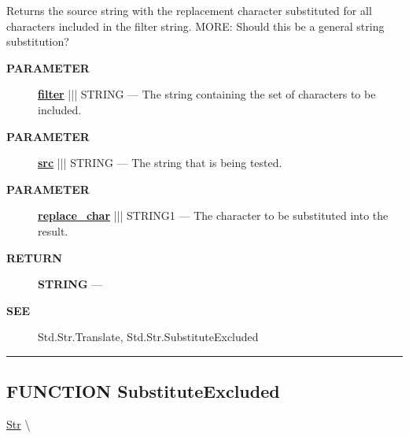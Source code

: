 \par





Returns the source string with the replacement character substituted for all characters included in the filter string. MORE: Should this be a general string substitution?






\par
\begin{description}
\item [\colorbox{tagtype}{\color{white} \textbf{\textsf{PARAMETER}}}] \textbf{\underline{filter}} ||| STRING --- The string containing the set of characters to be included.
\item [\colorbox{tagtype}{\color{white} \textbf{\textsf{PARAMETER}}}] \textbf{\underline{src}} ||| STRING --- The string that is being tested.
\item [\colorbox{tagtype}{\color{white} \textbf{\textsf{PARAMETER}}}] \textbf{\underline{replace\_char}} ||| STRING1 --- The character to be substituted into the result.
\end{description}







\par
\begin{description}
\item [\colorbox{tagtype}{\color{white} \textbf{\textsf{RETURN}}}] \textbf{STRING} --- 
\end{description}







\par
\begin{description}
\item [\colorbox{tagtype}{\color{white} \textbf{\textsf{SEE}}}] Std.Str.Translate, Std.Str.SubstituteExcluded
\end{description}



\rule{\linewidth}{0.5pt}
\subsection*{\textsf{\colorbox{headtoc}{\color{white} FUNCTION}
SubstituteExcluded}}

\hypertarget{ecldoc:str.substituteexcluded}{}
\hspace{0pt} \hyperlink{ecldoc:Str}{Str} \textbackslash 

